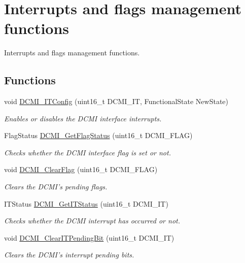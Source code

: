 \hypertarget{group___d_c_m_i___group3}{\section{Interrupts and flags management functions}
\label{group___d_c_m_i___group3}
}


Interrupts and flags management functions.  


\subsection*{Functions}
\begin{DoxyCompactItemize}
\item 
void \hyperlink{group___d_c_m_i___group3_ga3d89fb10384dff1dfd9197fbb6c6b2eb}{D\-C\-M\-I\-\_\-\-I\-T\-Config} (uint16\-\_\-t D\-C\-M\-I\-\_\-\-I\-T, Functional\-State New\-State)
\begin{DoxyCompactList}\small\item\em Enables or disables the D\-C\-M\-I interface interrupts. \end{DoxyCompactList}\item 
Flag\-Status \hyperlink{group___d_c_m_i___group3_ga1b66e1966fbea902a8e7015c56db7587}{D\-C\-M\-I\-\_\-\-Get\-Flag\-Status} (uint16\-\_\-t D\-C\-M\-I\-\_\-\-F\-L\-A\-G)
\begin{DoxyCompactList}\small\item\em Checks whether the D\-C\-M\-I interface flag is set or not. \end{DoxyCompactList}\item 
void \hyperlink{group___d_c_m_i___group3_ga1c93caf3ccfecf07cec8e1e0f844ddaa}{D\-C\-M\-I\-\_\-\-Clear\-Flag} (uint16\-\_\-t D\-C\-M\-I\-\_\-\-F\-L\-A\-G)
\begin{DoxyCompactList}\small\item\em Clears the D\-C\-M\-I's pending flags. \end{DoxyCompactList}\item 
I\-T\-Status \hyperlink{group___d_c_m_i___group3_gac0b27821aab3ee6b73ae8a6c6339fed5}{D\-C\-M\-I\-\_\-\-Get\-I\-T\-Status} (uint16\-\_\-t D\-C\-M\-I\-\_\-\-I\-T)
\begin{DoxyCompactList}\small\item\em Checks whether the D\-C\-M\-I interrupt has occurred or not. \end{DoxyCompactList}\item 
void \hyperlink{group___d_c_m_i___group3_ga908e6dad7bc5f4f4bbc512f679222c55}{D\-C\-M\-I\-\_\-\-Clear\-I\-T\-Pending\-Bit} (uint16\-\_\-t D\-C\-M\-I\-\_\-\-I\-T)
\begin{DoxyCompactList}\small\item\em Clears the D\-C\-M\-I's interrupt pending bits. \end{DoxyCompactList}\end{DoxyCompactItemize}


